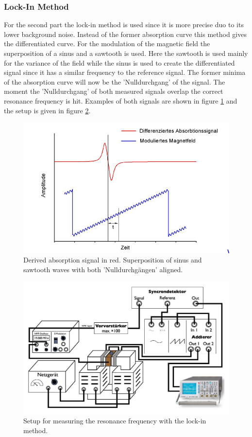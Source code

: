 \subsubsection{Lock-In Method}
For the second part the lock-in method is used since it is more precise duo to its lower background noise. Instead of the former absorption curve this method gives the differentiated curve. For the modulation of the magnetic field the superposition of a sinus and a sawtooth is used. Here the sawtooth is used mainly for the variance of the field while the sinus is used to create the differentiated signal since it has a similar frequency to the reference signal. The former minima of the absorption curve will now be the 'Nulldurchgang' of the signal. The moment the 'Nulldurchgang' of both measured signals overlap the correct resonance frequency is hit. Examples of both signals are shown in figure \ref{SägezahnBsp} and the setup is given in figure \ref{Exp_part2}.
\begin{figure}[h]
	\includegraphics[scale=1]{Bild/BspLockIn}
	\centering
	\caption{Derived absorption signal in red. Superposition of sinus and sawtooth waves with both 'Nulldurchgängen' aligned.}
	\label{SägezahnBsp}
\end{figure}
\begin{figure}[h]
	\includegraphics[scale=1]{Bild/Setup2}
	\centering
	\caption[Block Diagram for Setup 2]{Setup for measuring the resonance frequency with the lock-in method.}
	\label{Exp_part2}
\end{figure}


